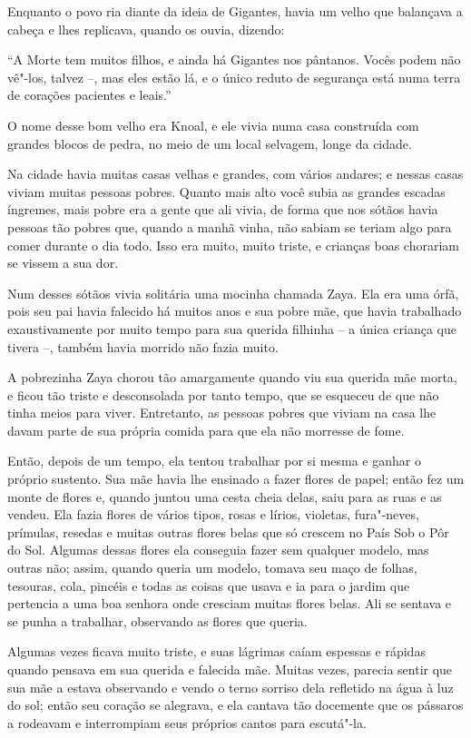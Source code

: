 Enquanto o povo ria diante da ideia de Gigantes, havia um velho que
balançava a cabeça e lhes replicava, quando os ouvia, dizendo:

``A Morte tem muitos filhos, e ainda há Gigantes nos pântanos. Vocês
podem não vê"-los, talvez --, mas eles estão lá, e o único reduto de
segurança está numa terra de corações pacientes e leais.''

O nome desse bom velho era Knoal, e ele vivia numa casa construída com
grandes blocos de pedra, no meio de um local selvagem, longe da cidade.

Na cidade havia muitas casas velhas e grandes, com vários andares; e
nessas casas viviam muitas pessoas pobres. Quanto mais alto você subia
as grandes escadas íngremes, mais pobre era a gente que ali vivia, de
forma que nos sótãos havia pessoas tão pobres que, quando a manhã vinha,
não sabiam se teriam algo para comer durante o dia todo. Isso era
muito, muito triste, e crianças boas chorariam se vissem a sua dor.

Num desses sótãos vivia solitária uma mocinha chamada Zaya. Ela era uma
órfã, pois seu pai havia falecido há muitos anos e sua pobre mãe, que
havia trabalhado exaustivamente por muito tempo para sua querida
filhinha -- a única criança que tivera --, também havia morrido não
fazia muito.

A pobrezinha Zaya chorou tão amargamente quando viu sua querida mãe
morta, e ficou tão triste e desconsolada por tanto tempo, que se
esqueceu de que não tinha meios para viver. Entretanto, as pessoas
pobres que viviam na casa lhe davam parte de sua própria comida para que
ela não morresse de fome.

Então, depois de um tempo, ela tentou trabalhar por si mesma e ganhar o
próprio sustento. Sua mãe havia lhe ensinado a fazer flores de papel;
então fez um monte de flores e, quando juntou uma cesta cheia delas,
saiu para as ruas e as vendeu. Ela fazia flores de vários tipos, rosas e
lírios, violetas, fura"-neves, prímulas, resedas e muitas outras flores
belas que só crescem no País Sob o Pôr do Sol. Algumas dessas flores ela conseguia
fazer sem qualquer modelo, mas outras não; assim, quando queria um
modelo, tomava seu maço de folhas, tesouras, cola, pincéis e todas as
coisas que usava e ia para o jardim que pertencia a uma boa senhora onde
cresciam muitas flores belas. Ali se sentava e se punha a trabalhar,
observando as flores que queria.

Algumas vezes ficava muito triste, e suas lágrimas caíam espessas e
rápidas quando pensava em sua querida e falecida mãe. Muitas vezes,
parecia sentir que sua mãe a estava observando e vendo o terno sorriso
dela refletido na água à luz do sol; então seu coração se alegrava, e
ela cantava tão docemente que os pássaros a rodeavam e interrompiam seus
próprios cantos para escutá"-la.

